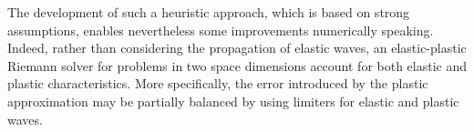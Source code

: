  
The development of such a heuristic approach, which is based on strong assumptions, enables nevertheless some improvements numerically speaking.
Indeed, rather than considering the propagation of elastic waves, an elastic-plastic Riemann solver for problems in two space dimensions account for both elastic and plastic characteristics.
More specifically, the error introduced by the plastic approximation may be partially balanced by using limiters for elastic and plastic waves.






